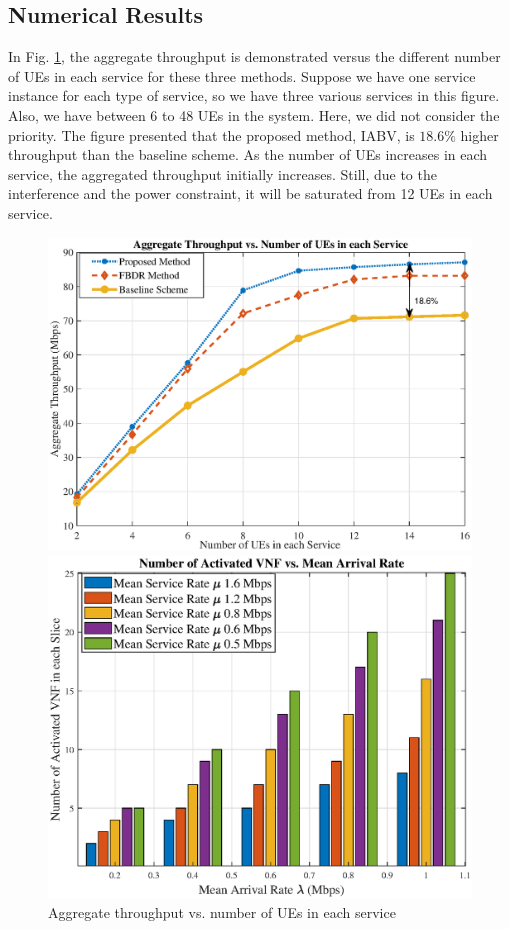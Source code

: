 \documentclass[lettersize,journal]{IEEEtran}
\begin{document}
\subsection{Numerical Results}
In Fig. \ref{fig:1}, the aggregate throughput is demonstrated versus the different number of UEs in each service for these three methods. Suppose we have one service instance for each type of service, so we have three various services in this figure. Also, we have between 6 to 48 UEs in the system.
Here, we did not consider the priority. The figure presented that the proposed method, IABV, is $18.6\%$ higher throughput than the baseline scheme.
As the number of UEs increases in each service, the aggregated throughput initially increases. Still, due to the interference and the power constraint, it will be saturated from 12 UEs in each service.
\begin{figure}%
  \centering
  \captionsetup{justification=centering}
  \begin{minipage}[b]{0.4\textwidth}
    \includegraphics[scale = 0.3]{Arate_ue1.eps}
    \caption{Aggregate throughput vs. number of UEs in each service}%
    \label{fig:1}
  \end{minipage}
  \qquad
  \begin{minipage}[b]{0.4\textwidth}
       \includegraphics[scale = 0.30]{vnfNum1.eps}

\end{minipage}
\end{figure}
\end{document}
